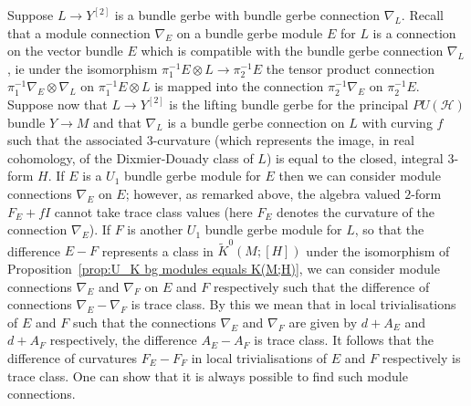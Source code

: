 \documentclass[a4paper,reqno]{amsart}
\theoremstyle{plain}
\theoremstyle{definition}
\theoremstyle{remark}
\numberwithin{equation}{section}
\numberwithin{figure}{section}
\newcommand{\<}{\langle}
\renewcommand{\>}{\rangle}
\begin{document}
Suppose $L\to Y^{[2]}$ is a bundle gerbe with 
bundle gerbe connection $\nabla_L$.  
Recall that a module connection $\nabla_E$ 
on a bundle gerbe module $E$ for $L$ is a connection on 
the vector bundle $E$ which is compatible with the 
bundle gerbe connection $\nabla_L$, ie under the 
isomorphism $\pi_1^{-1}E\otimes L\to \pi_2^{-1}E$ 
the tensor product connection $\pi_1^{-1}\nabla_E\otimes 
\nabla_L$ on $\pi_1^{-1}E\otimes L$ is mapped into 
the connection $\pi_2^{-1}\nabla_E$ on $\pi_2^{-1}E$.  
Suppose now that $L\to Y^{[2]}$ is the lifting bundle 
gerbe for the principal $PU(\mathcal{H})$ bundle 
$Y\to M$ and that $\nabla_L$ is a bundle gerbe 
connection on $L$ with curving $f$ such that the 
associated $3$-curvature (which represents the image, in 
real cohomology, of the Dixmier-Douady class of $L$) is 
equal to the closed, integral $3$-form $H$.  If $E$ is a 
$U_1$ bundle gerbe module for $E$ then we can consider 
module connections $\nabla_E$ on $E$; however, as remarked 
above, the algebra valued $2$-form $F_E +fI$ cannot take 
trace class values (here $F_E$ denotes the curvature 
of the connection $\nabla_E$).  If $F$ is another 
$U_1$ bundle gerbe module for $L$, so that the difference 
$E-F$ represents a class in $\tilde{K}^0(M;[H])$ 
under the isomorphism of Proposition~\ref{prop:U_K 
bg modules equals K(M;H)}, we can consider  
module connections $\nabla_E$ and $\nabla_F$ on $E$ and 
$F$ respectively such that the difference of connections 
$\nabla_E - \nabla_F$ is trace class.  By this we mean 
that in local trivialisations of $E$ and $F$ such that 
the connections $\nabla_E$ and $\nabla_F$ are given by 
$d + A_E$ and $d + A_F$ respectively, the difference 
$A_E - A_F$ is trace class.  It follows that the difference   
of curvatures $F_E - F_F$ in local trivialisations of $E$ and $F$ 
respectively is trace class.  One can show that it is 
always possible to find such module connections.    
\end{document}
